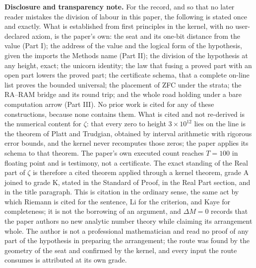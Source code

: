 \documentclass[10pt,twocolumn]{article}
\begin{document}
\textbf{Disclosure and transparency note.} For the record, and so that
no later reader mistakes the division of labour in this paper, the
following is stated once and exactly. What is established from first
principles in the kernel, with no user-declared axiom, is the paper's
own: the seat and its one-bit distance from the value (Part I); the
address of the value and the logical form of the hypothesis, given the
imports the Methods name (Part II); the division of the hypothesis at
any height, exact; the unicorn identity; the law that fusing a proved
part with an open part lowers the proved part; the certificate schema,
that a complete on-line list proves the bounded universal; the placement
of ZFC under the strata; the RA--RAM bridge and its round trip; and the
whole road holding under a bare computation arrow (Part III). No prior
work is cited for any of these constructions, because none contains
them. What is cited and not re-derived is the numerical content for
\(\zeta\): that every zero to height \(3 \times 10^{12}\) lies on the
line is the theorem of Platt and Trudgian, obtained by interval
arithmetic with rigorous error bounds, and the kernel never recomputes
those zeros; the paper applies its schema to that theorem. The paper's
own executed count reaches \(T = 100\) in floating point and is
testimony, not a certificate. The exact standing of the Real part of
\(\zeta\) is therefore a cited theorem applied through a kernel theorem,
grade A joined to grade K, stated in the Standard of Proof, in the Real
Part section, and in the title paragraph. This is citation in the
ordinary sense, the same act by which Riemann is cited for the sentence,
Li for the criterion, and Kaye for completeness; it is not the borrowing
of an argument, and \(\Delta M = 0\) records that the paper authors no
new analytic number theory while claiming its arrangement whole. The
author is not a professional mathematician and read no proof of any part
of the hypothesis in preparing the arrangement; the route was found by
the geometry of the seat and confirmed by the kernel, and every input
the route consumes is attributed at its own grade.
\end{document}
